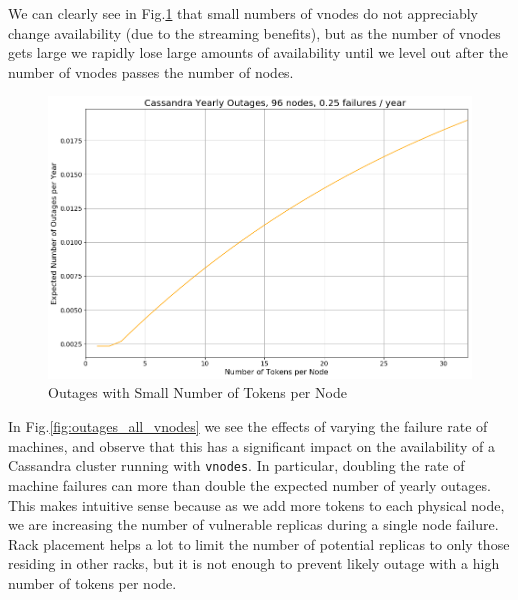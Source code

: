 \documentclass{article}
\begin{document}
We can clearly see in Fig.\ref{fig:outages_small_vnodes} that small numbers of
vnodes do not appreciably change availability (due to the streaming benefits),
but as the number of vnodes gets large we rapidly lose large amounts of
availability until we level out after the number of vnodes passes the number of
nodes.

\begin{figure}[h!]
    \centering
    \includegraphics[width=1.0\textwidth]{images/outages_vnodes_small.png}
    \caption{Outages with Small Number of Tokens per Node}
    \label{fig:outages_small_vnodes}
\end{figure}

In Fig.\ref{fig:outages_all_vnodes} we see the effects of varying the failure
rate of machines, and observe that this has a significant impact on the
availability of a Cassandra cluster running with \texttt{vnodes}. In
particular, doubling the rate of machine failures can more than double the
expected number of yearly outages. This makes intuitive sense because as we add
more tokens to each physical node, we are increasing the number of vulnerable
replicas during a single node failure. Rack placement helps a lot to limit the
number of potential replicas to only those residing in other racks, but it is
not enough to prevent likely outage with a high number of tokens per node.
\end{document}
